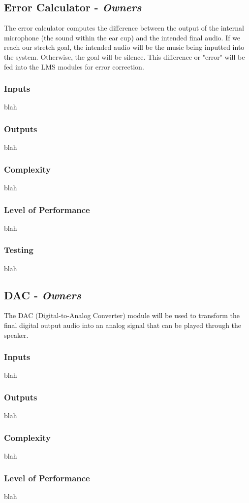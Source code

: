 \documentclass[12pt]{fpgairpods}
\begin{document}
\begin{multicols}{2}
\subsection{Error Calculator - \textit{Owners}}
The error calculator computes the difference between the output of the internal microphone (the sound within the ear cup) and the intended final audio. If we reach our stretch goal, the intended audio will be the music being inputted into the system. Otherwise, the goal will be silence. This difference or "error" will be fed into the LMS modules for error correction.
\subsubsection{Inputs}
blah
\subsubsection{Outputs}
blah
\subsubsection{Complexity}
blah
\subsubsection{Level of Performance}
blah
\subsubsection{Testing}
blah

\subsection{DAC - \textit{Owners}}
The DAC (Digital-to-Analog Converter) module will be used to transform the final digital output audio into an analog signal that can be played through the speaker.
\subsubsection{Inputs}
blah
\subsubsection{Outputs}
blah
\subsubsection{Complexity}
blah
\subsubsection{Level of Performance}
blah

\end{multicols}
\end{document}
